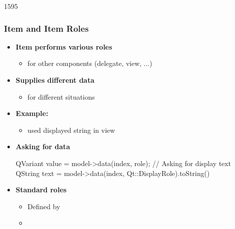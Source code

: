 \begin{slide}[fragile]{1595}\frametitle{Item and Item Roles}
  \begin{itemize}
  \item \textbf{Item performs various roles}
    \begin{itemize}
    \item for other components (delegate, view, ...)
    \end{itemize}
  \item \textbf{Supplies different data}
    \begin{itemize}
    \item for different situations
    \end{itemize}
  \item \textbf{Example:}
    \begin{itemize}
    \item {} used displayed string in view
    \end{itemize}
  \item \textbf{Asking for data}
    \begin{cpp}
QVariant value = model->data(index, role);      
// Asking for display text
QString text = model->data(index, Qt::DisplayRole).toString()        
    \end{cpp}
  \item \textbf{Standard roles}
    \begin{itemize}
    \item Defined by 
    \item {}
    \end{itemize}
  \end{itemize}
\end{slide}


